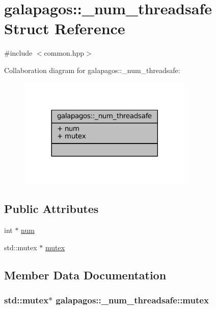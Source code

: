 \hypertarget{structgalapagos_1_1__num__threadsafe}{}\section{galapagos\+:\+:\+\_\+num\+\_\+threadsafe Struct Reference}
\label{structgalapagos_1_1__num__threadsafe}


{\ttfamily \#include $<$common.\+hpp$>$}



Collaboration diagram for galapagos\+:\+:\+\_\+num\+\_\+threadsafe\+:
\nopagebreak
\begin{figure}[H]
\begin{center}
\leavevmode
\includegraphics[width=236pt]{structgalapagos_1_1__num__threadsafe__coll__graph}
\end{center}
\end{figure}
\subsection*{Public Attributes}
\begin{DoxyCompactItemize}
\item 
int $\ast$ \hyperlink{structgalapagos_1_1__num__threadsafe_aa1de95bb520c7fa28c2edca48dc11f94}{num}
\item 
std\+::mutex $\ast$ \hyperlink{structgalapagos_1_1__num__threadsafe_ad63f0485460722ef27b2f38f9a1ab177}{mutex}
\end{DoxyCompactItemize}


\subsection{Member Data Documentation}
\subsubsection[{\texorpdfstring{mutex}{mutex}}]{\setlength{\rightskip}{0pt plus 5cm}std\+::mutex$\ast$ galapagos\+::\+\_\+num\+\_\+threadsafe\+::mutex}\hypertarget{structgalapagos_1_1__num__threadsafe_ad63f0485460722ef27b2f38f9a1ab177}{}\label{structgalapagos_1_1__num__threadsafe_ad63f0485460722ef27b2f38f9a1ab177}
